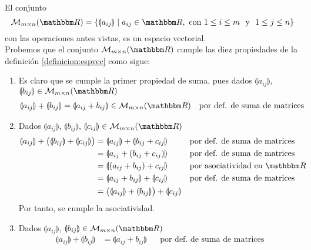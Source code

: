 \begin{theorem}
    El conjunto
    $$\matrizmn = \left\{ \llparenthesis a_{ij} \rrparenthesis \mid a_{ij} \in \RR, \text{ con } 1 \leq i \leq m \text{ ~y~ } 1 \leq j \leq n \right\}$$
    con las operaciones antes vistas, es un espacio vectorial. \\
    \demostracion Probemos que el conjunto $\matrizmn$ cumple las diez propiedades de la definición \ref{definicion:espvec} como sigue:
    \begin{enumerate}[label=\roman*)]
        \item Es claro que se cumple la primer propiedad de suma, pues dados $\llparenthesis a_{ij} \rrparenthesis$, $\llparenthesis b_{ij} \rrparenthesis \in \matrizmn$
        \begin{align*}
            \llparenthesis a_{ij} \rrparenthesis + \llparenthesis b_{ij} \rrparenthesis & = \llparenthesis a_{ij} +b_{ij} \rrparenthesis \in \matrizmn && \text{por def. de suma de matrices}
        \end{align*}
        \item Dados $\llparenthesis a_{ij} \rrparenthesis$, $\llparenthesis b_{ij} \rrparenthesis$, $\llparenthesis c_{ij} \rrparenthesis \in \matrizmn$
        \begin{align*}
            \llparenthesis a_{ij} \rrparenthesis + \big( \llparenthesis b_{ij} \rrparenthesis + \llparenthesis c_{ij} \rrparenthesis \big) & = \llparenthesis a_{ij} \rrparenthesis + \llparenthesis b_{ij} + c_{ij} \rrparenthesis && \text{por def. de suma de matrices} \\
            & = \llparenthesis a_{ij} + (b_{ij} + c_{ij}) \rrparenthesis && \text{por def. de suma de matrices} \\
            & = \llparenthesis (a_{ij} + b_{ij}) + c_{ij} \rrparenthesis && \text{por asociatividad en $\RR$} \\
            & = \llparenthesis a_{ij} + b_{ij} \rrparenthesis + \llparenthesis c_{ij} \rrparenthesis && \text{por def. de suma de matrices} \\
            & = \big( \llparenthesis a_{ij} \rrparenthesis + \llparenthesis b_{ij} \rrparenthesis \big) + \llparenthesis c_{ij} \rrparenthesis
        \end{align*}
        Por tanto, se cumple la asociatividad.
        \item Dados $\llparenthesis a_{ij} \rrparenthesis$, $\llparenthesis b_{ij} \rrparenthesis \in \matrizmn$
        \begin{align*}
            \llparenthesis a_{ij} \rrparenthesis + \llparenthesis b_{ij} \rrparenthesis & = \llparenthesis a_{ij} +b_{ij} \rrparenthesis && \text{por def. de suma de matrices} \\

\end{align*}
\end{enumerate}
\end{theorem}
